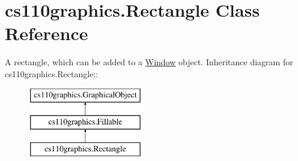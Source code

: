 \hypertarget{classcs110graphics_1_1Rectangle}{
\section{cs110graphics.Rectangle Class Reference}
\label{classcs110graphics_1_1Rectangle}
}


A rectangle, which can be added to a \hyperlink{classcs110graphics_1_1Window}{Window} object.  
Inheritance diagram for cs110graphics.Rectangle::\begin{figure}[H]
\begin{center}
\leavevmode
\includegraphics[height=3cm]{classcs110graphics_1_1Rectangle}
\end{center}
\end{figure}

